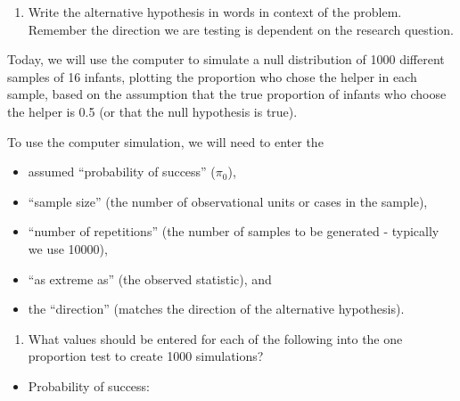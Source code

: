 \documentclass[
]{report}
\providecommand{\tightlist}{%
  \setlength{\itemsep}{0pt}\setlength{\parskip}{0pt}}
\begin{document}
\vspace{0.3in}

\begin{enumerate}
\def\labelenumi{\arabic{enumi}.}
\setcounter{enumi}{1}
\tightlist
\item
  Write the alternative hypothesis in words in context of the problem. Remember the direction we are testing is dependent on the research question.
\end{enumerate}

\vspace{0.8in}

Today, we will use the computer to simulate a null distribution of 1000 different samples of 16 infants, plotting the proportion who chose the helper in each sample, based on the assumption that the true proportion of infants who choose the helper is 0.5 (or that the null hypothesis is true).

\newpage

To use the computer simulation, we will need to enter the

\begin{itemize}
\tightlist
\item
  assumed ``probability of success'' (\(\pi_0\)),
\item
  ``sample size'' (the number of observational units or cases in the sample),
\item
  ``number of repetitions'' (the number of samples to be generated - typically we use 10000),
\item
  ``as extreme as'' (the observed statistic), and
\item
  the ``direction'' (matches the direction of the alternative hypothesis).
\end{itemize}

\begin{enumerate}
\def\labelenumi{\arabic{enumi}.}
\setcounter{enumi}{2}
\tightlist
\item
  What values should be entered for each of the following into the one proportion test to create 1000 simulations?
\end{enumerate}

\vspace{1mm}

\begin{itemize}
\tightlist
\item
  Probability of success:
\end{itemize}

\vspace{.2in}
\end{document}
